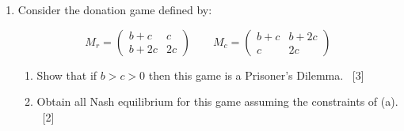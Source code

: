 \documentclass[12pt,a4paper]{article}
\begin{document}
\begin{enumerate}
\begin{enumerate}
        \item Consider the following Normal Form Game defined by:

            \[
                M_r=
\begin{pmatrix}
4 & -2 \\
-1 & 3 \\
\end{pmatrix}
\qquad
            M_c=
\begin{pmatrix}
2 & -2 \\
-3 & 2 \\
\end{pmatrix}
\]

        State and justify which pairs of strategies are best responses to each
            other:
            \begin{enumerate}
                \item \(\sigma_r=(1, 0)\) and \(\sigma_c=(0, 1)\)
                \item \(\sigma_r=(1/5, 4/5)\) and \(\sigma_c=(0, 1)\)
                \item \(\sigma_r=(5/9, 4/9)\) and \(\sigma_c=(1/2, 1/2)\)
            \end{enumerate}
            ~\hfill{[8]}


        \item Using your answer to (c) or otherwise, find all Nash equilibria
            for the game.
            ~\hfill{[4]}
        
    \end{enumerate}

\newpage

\item
    Consider the donation game defined by:

    \[
        M_r = 
        \begin{pmatrix}    
            b + c & c\\
            b + 2 c    & 2 c
        \end{pmatrix}
        \qquad
        M_c = 
        \begin{pmatrix}    
            b + c & b + 2c\\
            c    & 2 c
        \end{pmatrix}
    \]


    \begin{enumerate}
        \item Show that if \(b>c>0\) then this game is a Prisoner's Dilemma.
            ~\hfill{[3]}
    \item Obtain all Nash equilibrium for this game assuming the constraints of
        (a).
            ~\hfill{[2]}


\end{enumerate}
\end{enumerate}
\end{document}

